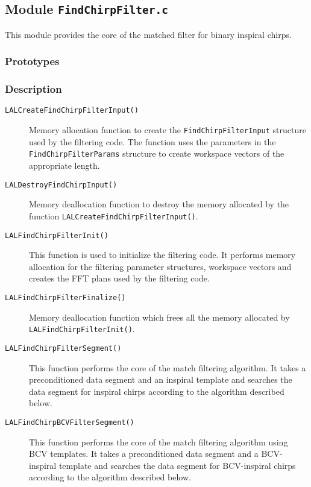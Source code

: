 \subsection{Module \texttt{FindChirpFilter.c}}
\label{ss:FindChirpFilter.c}

This module provides the core of the matched filter for binary inspiral
chirps.

\subsubsection*{Prototypes}
\vspace{0.1in}


\subsubsection*{Description}

\begin{description}
\item[\texttt{LALCreateFindChirpFilterInput()}] Memory allocation function to
create the \texttt{FindChirpFilterInput} structure used by the filtering code.
The function uses the parameters in the \texttt{FindChirpFilterParams}
structure to create workspace vectors of the appropriate length.

\item[\texttt{LALDestroyFindChirpInput()}] Memory deallocation function to
destroy the memory allocated by the function
\texttt{LALCreateFindChirpFilterInput()}.

\item[\texttt{LALFindChirpFilterInit()}] This function is used to initialize
the filtering code. It performs memory allocation for the filtering parameter
structures, workspace vectors and creates the FFT plans used by the filtering
code.

\item[\texttt{LALFindChirpFilterFinalize()}] Memory deallocation function
which frees all the memory allocated by \texttt{LALFindChirpFilterInit()}.

\item[\texttt{LALFindChirpFilterSegment()}] This function performs the core of
the match filtering algorithm. It takes a preconditioned data segment and an
inspiral template and searches the data segment for inspiral chirps according
to the algorithm described below.

\item[\texttt{LALFindChirpBCVFilterSegment()}] This function performs the core 
of the match filtering algorithm using BCV templates. It takes a preconditioned
data segment and a
BCV-inspiral template and searches the data segment for BCV-inspiral chirps 
according to the algorithm described below.

\end{description}

